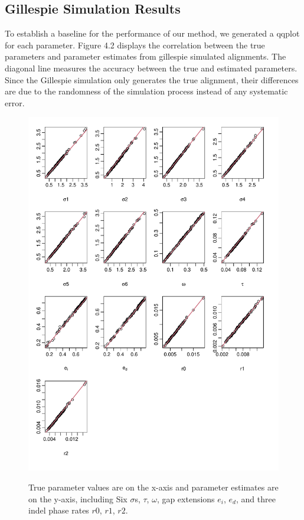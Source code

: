 \subsection{Gillespie Simulation Results}
To establish a baseline for the performance of our method, we generated a qqplot for each parameter. Figure 4.2 displays the correlation between the true parameters and parameter estimates from gillespie simulated alignments. The diagonal line measures the accuracy between the true and estimated parameters. Since the Gillespie simulation only generates the true alignment, their differences are due to the randomness of the simulation process instead of any systematic error. 
\begin{figure}[H]
     \centering
     \begin{minipage}[t]{1\textwidth}
     \includegraphics[width=1\linewidth,height=1.2\linewidth]{Fig2.pdf}
     { {True parameter values are on the x-axis and parameter estimates are on the y-axis, including Six $\sigma$s, $\tau$, $\omega$, gap extensions $e_i$, $e_d$, and three indel phase rates $r0$, $r1$, $r2$.}
 \par}
     \end{minipage}
\end{figure}
\newpage

